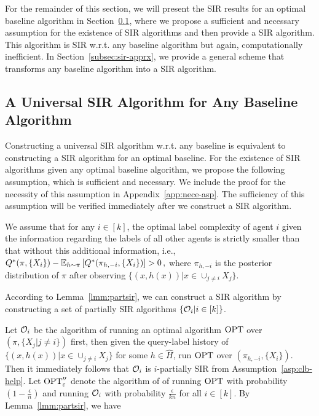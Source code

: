For the remainder of this section, we will present the SIR results for an optimal baseline algorithm in Section~\ref{subsec:sir-opt}, where we propose a sufficient and necessary assumption for the existence of SIR algorithms and then provide a SIR algorithm.
This algorithm is SIR w.r.t. any baseline algorithm but again, computationally inefficient.
In Section~\ref{subsec:sir-apprx}, we provide a general scheme that transforms any baseline algorithm into a SIR algorithm.



\subsection{A Universal SIR Algorithm for Any Baseline Algorithm}\label{subsec:sir-opt}
\vspace{-0.5em}
%
Constructing a universal SIR algorithm w.r.t. any baseline is equivalent to constructing a SIR algorithm for an optimal baseline.
For the existence of SIR algorithms given any optimal baseline algorithm, we propose the following assumption, which is sufficient and necessary. We include the proof for the necessity of this assumption in Appendix~\ref{app:nece-asp}. The sufficiency of this assumption will be verified immediately after we construct a SIR algorithm.
\begin{assumption}\label{asp:clb-help}
We assume that for any $i\in [k]$, the optimal label complexity of agent $i$ given the information regarding the labels of all other agents is strictly smaller than that without this additional information, i.e.,
    $Q^*(\pi, \{X_i\})- \mathbb{E}_{h\sim \pi}\left[Q^*(\pi_{h,-i}, \{X_i\})\right] >0\,,$
    where $\pi_{h,-i}$ is the posterior distribution of $\pi$ after observing $\{(x,h(x))|x\in \cup_{j\neq i} X_{j}\}$. 
\end{assumption}


According to Lemma~\ref{lmm:partsir}, we can construct a SIR algorithm by constructing a set of partially SIR algorithms $\{\mathcal{O}_i|i\in [k]\}$. 

Let $\mathcal{O}_i$ be the algorithm of running an optimal algorithm $\textrm{OPT}$ over $(\pi, \{X_j|j\neq i\})$ first, then given the query-label history of $\{(x, h(x))|x\in \cup_{j\neq i} X_j\}$ for some $h\in \hat H$, run $\textrm{OPT}$ over $(\pi_{h,-i}, \{X_i\})$. Then it immediately follows that $\mathcal{O}_i$ is $i$-partially SIR from Assumption~\ref{asp:clb-help}. Let $\textrm{OPT}_\varepsilon''$ denote the algorithm of of running $\textrm{OPT}$ with probability $(1-\frac{\epsilon}{n})$ and running $\mathcal{O}_i$ with probability $\frac{\epsilon}{kn}$ for all $i\in [k]$. By Lemma~\ref{lmm:partsir}, we have

